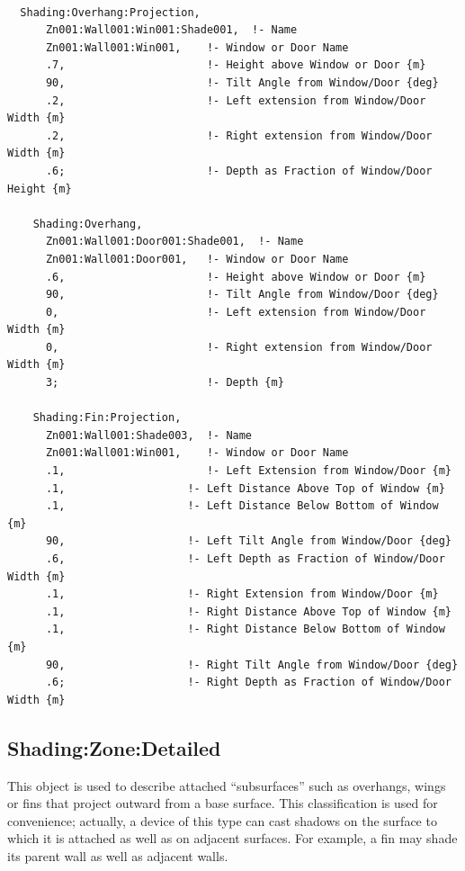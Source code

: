 \begin{lstlisting}

  Shading:Overhang:Projection,
      Zn001:Wall001:Win001:Shade001,  !- Name
      Zn001:Wall001:Win001,    !- Window or Door Name
      .7,                      !- Height above Window or Door {m}
      90,                      !- Tilt Angle from Window/Door {deg}
      .2,                      !- Left extension from Window/Door Width {m}
      .2,                      !- Right extension from Window/Door Width {m}
      .6;                      !- Depth as Fraction of Window/Door Height {m}

    Shading:Overhang,
      Zn001:Wall001:Door001:Shade001,  !- Name
      Zn001:Wall001:Door001,   !- Window or Door Name
      .6,                      !- Height above Window or Door {m}
      90,                      !- Tilt Angle from Window/Door {deg}
      0,                       !- Left extension from Window/Door Width {m}
      0,                       !- Right extension from Window/Door Width {m}
      3;                       !- Depth {m}

    Shading:Fin:Projection,
      Zn001:Wall001:Shade003,  !- Name
      Zn001:Wall001:Win001,    !- Window or Door Name
      .1,                      !- Left Extension from Window/Door {m}
      .1,                   !- Left Distance Above Top of Window {m}
      .1,                   !- Left Distance Below Bottom of Window {m}
      90,                   !- Left Tilt Angle from Window/Door {deg}
      .6,                   !- Left Depth as Fraction of Window/Door Width {m}
      .1,                   !- Right Extension from Window/Door {m}
      .1,                   !- Right Distance Above Top of Window {m}
      .1,                   !- Right Distance Below Bottom of Window {m}
      90,                   !- Right Tilt Angle from Window/Door {deg}
      .6;                   !- Right Depth as Fraction of Window/Door Width {m}
\end{lstlisting}

\subsection{Shading:Zone:Detailed}\label{shadingzonedetailed-000}

This object is used to describe attached ``subsurfaces'' such as overhangs, wings or fins that project outward from a base surface. This classification is used for convenience; actually, a device of this type can cast shadows on the surface to which it is attached as well as on adjacent surfaces. For example, a fin may shade its parent wall as well as adjacent walls.

